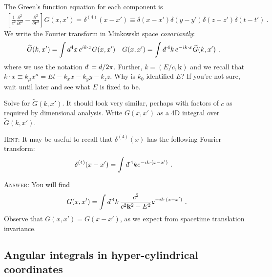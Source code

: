 \documentclass[12pt]{article}
\numberwithin{equation}{section}    %
\renewcommand{\tilde}{\widetilde}   %
\renewcommand{\vec}[1]{\mathbf{#1}} %
\newcommand{\dbar}{d\mkern-6mu\mathchar'26}    %
\begin{document}
The Green's function equation for each component is
\begin{align}
	\left[\frac{1}{c^2}\frac{\partial^2}{\partial t^2} - \frac{\partial^2}{\partial \vec{r}^2}\right] G(x,x') = \delta^{(4)}(x-x') \equiv \delta(x-x')\delta(y-y')\delta(z-z')\delta(t-t') \ .
	\label{eq:4D:define:G}
\end{align}
We write the Fourier transform in Minkowski space \emph{covariantly}:
\begin{align}
	\tilde G(k,x') &= \int d^4x \, e^{ik\cdot x} G(x,x')
	&
	G(x,x') &= \int \dbar^4k \, e^{-ik\cdot x} \tilde G(k,x') \ ,
\end{align}
where we use the notation $\dbar = d/2\pi$. Further, $k = (E/c,\vec k)$ and we recall that $k\cdot x \equiv k_\mu x^\mu = Et - k_x x - k_y y - k_z z$. 
Why is $k_0$ identified $E$? If you're not sure, wait until later and see what $E$ is fixed to be. 

Solve for $\tilde G(k,x')$. It should look very similar, perhaps with factors of $c$ as required by dimensional analysis.  Write $G(x,x')$ as a 4D integral over $\tilde G(k,x')$.

\textsc{Hint:} It may be useful to recall that $\delta^{(4)}(x)$ has the following Fourier transform: 
\begin{align}
	\delta^{(4)}(x-x') &= \int \dbar^4 k e^{-ik\cdot (x-x')} \ .
\end{align}

\textsc{Answer:} You will find
\begin{align}
	G(x,x') = \int \dbar^4k \, \frac{c^2}{c^2 \vec k^2 - E^2} e^{-ik\cdot (x-x')} \ .
	\label{eq:G:ft:1}
\end{align} 
Observe that $G(x,x') = G(x-x')$, as we expect from spacetime translation invariance.



\subsection{Angular integrals in hyper-cylindrical coordinates}
\end{document}
